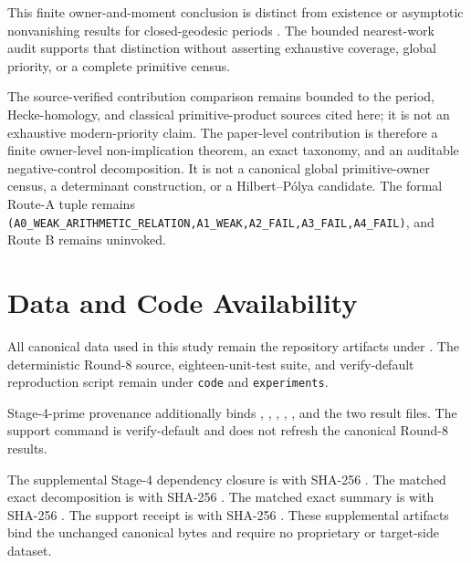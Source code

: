 \documentclass[11pt]{article}
\theoremstyle{definition}
\theoremstyle{remark}
\begin{document}
This finite owner-and-moment conclusion is distinct from existence or asymptotic nonvanishing results for closed-geodesic periods \citep{Katok1985,ConstantinescuNordentoft2025}. The bounded nearest-work audit supports that distinction without asserting exhaustive coverage, global priority, or a complete primitive census.

The source-verified contribution comparison remains bounded to the period, Hecke-homology, and classical primitive-product sources cited here; it is not an exhaustive modern-priority claim. The paper-level contribution is therefore a finite owner-level non-implication theorem, an exact taxonomy, and an auditable negative-control decomposition. It is not a canonical global primitive-owner census, a determinant construction, or a Hilbert--Pólya candidate. The formal Route-A tuple remains \texttt{(A0\_WEAK\_ARITHMETIC\_RELATION,A1\_WEAK,A2\_FAIL,A3\_FAIL,A4\_FAIL)}, and Route B remains uninvoked.

\section*{Data and Code Availability}
All canonical data used in this study remain the repository artifacts under
.
The deterministic Round-8 source, eighteen-unit-test suite, and verify-default reproduction script remain under \texttt{code} and \texttt{experiments}.

Stage-4-prime provenance additionally binds , , , , , and the two  result files. The support command is verify-default and does not refresh the canonical Round-8 results.

The supplemental Stage-4 dependency closure is
with SHA-256
.
The matched exact decomposition is
with SHA-256
.
The matched exact summary is
with SHA-256
.
The support receipt is
with SHA-256
.
These supplemental artifacts bind the unchanged canonical bytes and require no proprietary or target-side dataset.
\end{document}
